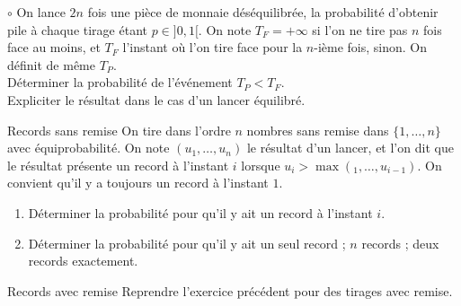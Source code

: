 \documentclass[french,a4paper]{article}
\theoremstyle{plain}
\theoremstyle{definition}
\theoremstyle{remark}
\begin{document}
\begin{ex}[Moulin.09]{$\circ$}
	On lance $2n$ fois une pièce de monnaie déséquilibrée, la probabilité d'obtenir pile à chaque tirage étant $p\in]0,1[$. On note $T_F=+\infty$ si l'on ne tire pas $n$ fois face au moins, et $T_F$ l'instant où l'on tire face pour la $n$-ième fois, sinon. On définit de même $T_P$. \\ Déterminer la probabilité de l'événement $T_P<T_F$. \\ Expliciter le résultat dans le cas d'un lancer équilibré.
\end{ex}

\begin{ex}[Moulin.10]{Records sans remise}
	On tire dans l'ordre $n$ nombres sans remise dans $\{1,\ldots,n\}$ avec équiprobabilité. On note $(u_1,\ldots,u_n)$ le résultat d'un lancer, et l'on dit que le résultat présente un record à l'instant $i$ lorsque $u_i>\max(_1,\ldots,u_{i-1})$. On convient qu'il y a toujours un record à l'instant $1$.
	\begin{enumerate}
		\item Déterminer la probabilité pour qu'il y ait un record à l'instant $i$.
		\item Déterminer la probabilité pour qu'il y ait un seul record ; $n$ records ; deux records exactement.
	\end{enumerate}
\end{ex}

\begin{ex}[Moulin.11]{Records avec remise}
	Reprendre l'exercice précédent pour des tirages avec remise.
\end{ex}
\end{document}
